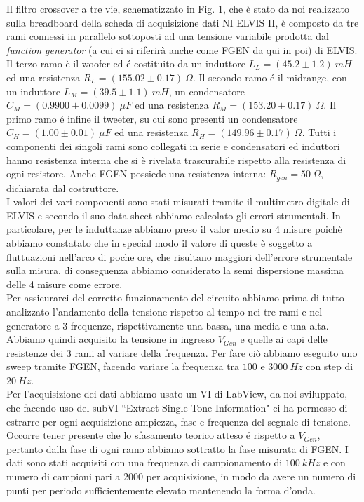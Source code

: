 \documentclass[]{article}
\begin{document}
Il filtro crossover a tre vie, schematizzato in Fig. 1, che è stato da noi realizzato sulla breadboard della scheda di acquisizione dati NI ELVIS II, è composto da tre rami connessi in parallelo sottoposti ad una tensione variabile prodotta dal \textit{function generator} (a cui ci si riferirà anche come FGEN da qui in poi) di ELVIS.\\
\hspace*{\parindent}Il terzo ramo è il woofer ed é costituito da un induttore $ L_{L} = (45.2 \pm 1.2)\:mH $ ed una resistenza $ R_{L} = (155.02 \pm 0.17) \: \Omega $. Il secondo ramo é il midrange, con un induttore $ L_{M} = (39.5 \pm 1.1)\:mH $, un condensatore $ C_{M} = (0.9900 \pm 0.0099)\:\mu F $ ed una resistenza $ R_{M} = (153.20 \pm 0.17) \: \Omega $. Il primo ramo é infine il tweeter, su cui sono presenti un condensatore $ C_{H} = (1.00 \pm 0.01)\:\mu F $ ed una resistenza $ R_{H} = (149.96 \pm 0.17) \: \Omega $. Tutti i componenti dei singoli rami sono collegati in serie e condensatori ed induttori hanno resistenza interna che si è rivelata trascurabile rispetto alla resistenza di ogni resistore. Anche FGEN possiede una resistenza interna: $ R_{gen} = 50 \: \Omega $, dichiarata dal costruttore.\\
\hspace*{\parindent}I valori dei vari componenti sono stati misurati tramite il multimetro digitale di ELVIS e secondo il suo data sheet abbiamo calcolato gli errori strumentali. In particolare, per le induttanze abbiamo preso il valor medio su 4 misure poichè abbiamo constatato che in special modo il valore di queste è soggetto a fluttuazioni nell'arco di poche ore, che risultano maggiori dell'errore strumentale sulla misura, di conseguenza abbiamo considerato la semi dispersione massima delle 4 misure come errore.\\
\hspace*{\parindent}Per assicurarci del corretto funzionamento del circuito abbiamo prima di tutto analizzato l'andamento della tensione rispetto al tempo nei tre rami e nel generatore a 3 frequenze, rispettivamente una bassa, una media e una alta. Abbiamo quindi acquisito la tensione in ingresso $ V_{Gen} $ e quelle ai capi delle resistenze dei 3 rami al variare della frequenza. Per fare ciò abbiamo eseguito uno sweep tramite FGEN, facendo variare la frequenza tra $ 100 $ e $ 3000 \:Hz$ con step di $ 20 \:Hz $.\\ 
\hspace*{\parindent}Per l'acquisizione dei dati abbiamo usato un VI di LabView, da noi sviluppato, che facendo uso del subVI ``Extract Single Tone Information" ci ha permesso di estrarre per ogni acquisizione ampiezza, fase e frequenza del segnale di tensione. Occorre tener presente che lo sfasamento teorico atteso é rispetto a $ V_{Gen} $, pertanto dalla fase di ogni ramo abbiamo sottratto la fase misurata di FGEN. I dati sono stati acquisiti con una frequenza di campionamento di $ 100\: kHz $ e con numero di campioni pari a $ 2000 $ per acquisizione, in modo da avere un numero di punti per periodo sufficientemente elevato mantenendo la forma d'onda.\\
\end{document}
